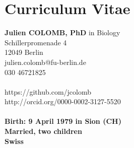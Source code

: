 %

\section* {Curriculum Vitae}






\small

\begin{minipage}[t]{\textwidth}
    \begin{minipage}[b]{0.5\textwidth}
        \textbf{Julien COLOMB, PhD} in Biology\\
         Schillerpromenade 4\\
        12049 Berlin\\
        julien.colomb@fu-berlin.de\\
        030 46721825\\
         \\
        https://github.com/jcolomb\\
         http://orcid.org/0000-0002-3127-5520\\
         \\
   
        \textbf{Birth: 9 April 1979 in Sion (CH)}\\
        \textbf{Married, two children}\\
        \textbf{Swiss}
         

\end{minipage}
\end{minipage}
